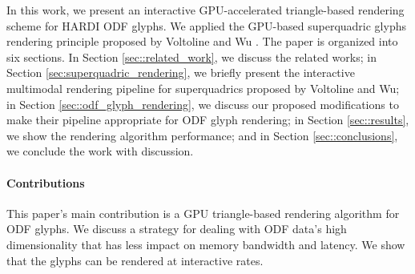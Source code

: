 \documentclass[twoside,twocolumn,10pt]{article}
\begin{document}
In this work, we present an interactive GPU-accelerated triangle-based rendering scheme for HARDI ODF glyphs. We applied the GPU-based superquadric glyphs rendering principle proposed by Voltoline and Wu \cite{voltoline2021}.
The paper is organized into six sections. In Section \ref{sec::related_work}, we discuss the related works; in Section \ref{sec:superquadric_rendering}, we briefly present the interactive multimodal rendering pipeline for superquadrics proposed by Voltoline and Wu; in Section \ref{sec::odf_glyph_rendering}, we discuss our proposed modifications to make their pipeline appropriate for ODF glyph rendering; in Section \ref{sec::results}, we show the rendering algorithm performance; and in Section \ref{sec::conclusions}, we conclude the work with discussion.

\paragraph*{\textbf{Contributions}}

This paper's main contribution is a GPU triangle-based rendering algorithm for ODF glyphs. We discuss a strategy for dealing with ODF data's high dimensionality that has less impact on memory bandwidth and latency. We show that the glyphs can be rendered at interactive rates.

\end{document}
